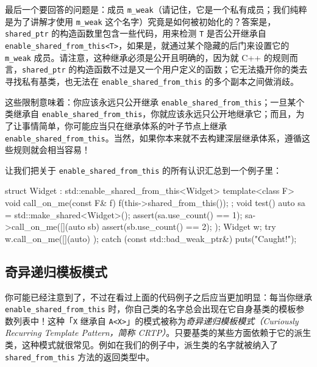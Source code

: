 最后一个要回答的问题是：成员 \texttt{m\_\allowbreak{}weak}（请记住，它是一个私有成员；我们纯粹是为了讲解才使用 \texttt{m\_\allowbreak{}weak} 这个名字）究竟是如何被初始化的？答案是，\texttt{shared\_\allowbreak{}ptr} 的构造函数里包含一些代码，用来检测 \texttt{T} 是否公开继承自 \texttt{enable\_\allowbreak{}shared\_\allowbreak{}from\_\allowbreak{}this<\allowbreak{}T>\allowbreak{}}，如果是，就通过某个隐藏的后门来设置它的 \texttt{m\_\allowbreak{}weak} 成员。请注意，这种继承必须是公开且明确的，因为就 C++ 的规则而言，\texttt{shared\_\allowbreak{}ptr} 的构造函数不过是又一个用户定义的函数；它无法撬开你的类去寻找私有基类，也无法在 \texttt{enable\_\allowbreak{}shared\_\allowbreak{}from\_\allowbreak{}this} 的多个副本之间做消歧。

这些限制意味着：你应该永远只公开继承 \texttt{enable\_\allowbreak{}shared\_\allowbreak{}from\_\allowbreak{}this}；一旦某个类继承自 \texttt{enable\_\allowbreak{}shared\_\allowbreak{}from\_\allowbreak{}this}，你就应该永远只公开地继承它；而且，为了让事情简单，你可能应当只在继承体系的叶子节点上继承 \texttt{enable\_\allowbreak{}shared\_\allowbreak{}from\_\allowbreak{}this}。当然，如果你本来就不去构建深层继承体系，遵循这些规则就会相当容易！

让我们把关于 \texttt{enable\_\allowbreak{}shared\_\allowbreak{}from\_\allowbreak{}this} 的所有认识汇总到一个例子里：

\begin{codebox}[cpp]
    struct Widget : std::enable_shared_from_this<Widget> {
      template<class F>
      void call_on_me(const F& f) {
        f(this->shared_from_this());
      }
    };
    void test() {
      auto sa = std::make_shared<Widget>();
      assert(sa.use_count() == 1);
      sa->call_on_me([](auto sb) {
        assert(sb.use_count() == 2);
      });
      Widget w;
      try {
        w.call_on_me([](auto) {});
      } catch (const std::bad_weak_ptr&) {
        puts("Caught!");
      }
    }
\end{codebox}

\subsection{奇异递归模板模式}

你可能已经注意到了，不过在看过上面的代码例子之后应当更加明显：每当你继承 \texttt{enable\_\allowbreak{}shared\_\allowbreak{}from\_\allowbreak{}this} 时，你自己类的名字总会出现在它自身基类的模板参数列表中！这种「\texttt{X} 继承自 \texttt{A<\allowbreak{}X>\allowbreak{}}」的模式被称为\emph{奇异递归模板模式（Curiously Recurring Template Pattern，简称 CRTP）}。只要基类的某些方面依赖于它的派生类，这种模式就很常见。例如在我们的例子中，派生类的名字就被纳入了 \texttt{shared\_\allowbreak{}from\_\allowbreak{}this} 方法的返回类型中。

